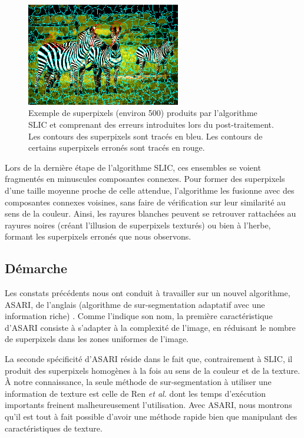 \begin{figure}[htb]
    \centering
    \includegraphics[width=0.6\textwidth]{images/asari/ex_slic}
    \caption{Exemple de superpixels (environ 500) produits par l'algorithme SLIC et comprenant des erreurs  introduites lors du post-traitement. Les contours des superpixels sont tracés en bleu. Les contours de certains superpixels erronés sont tracés en rouge. }
    \label{fig:asari:slic}
\end{figure}


Lors de la dernière étape de l'algorithme SLIC, ces ensembles se voient fragmentés en minuscules composantes connexes. Pour former des superpixels d'une taille moyenne proche de celle attendue, l'algorithme les fusionne avec des composantes connexes voisines, sans faire de vérification sur leur similarité au sens de la couleur. Ainsi, les rayures blanches peuvent se retrouver rattachées au rayures noires (créant l'illusion de superpixels texturés) ou bien à l'herbe, formant les superpixels erronés que nous observons.


\subsection{Démarche}

Les constats précédents nous ont conduit à travailler sur un nouvel algorithme, ASARI, de l'anglais  (algorithme de sur-segmentation adaptatif avec une information riche) \cite{mathieu2017asari}. Comme l'indique son nom, la première caractéristique d'ASARI consiste à s'adapter à la complexité de l'image, en réduisant le nombre de superpixels dans les zones uniformes de l'image.

La seconde spécificité d'ASARI réside dans le fait que, contrairement à SLIC, il produit des superpixels homogènes à la fois au sens de  la couleur et de la texture. À notre connaissance, la seule méthode de sur-segmentation à utiliser une information de texture est celle de Ren \textit{et al.} \cite{ren2003learning} dont les temps d'exécution importants  freinent malheureusement l'utilisation. Avec ASARI, nous montrons qu'il est tout à fait possible d'avoir une méthode rapide bien que manipulant des caractéristiques de texture. 

